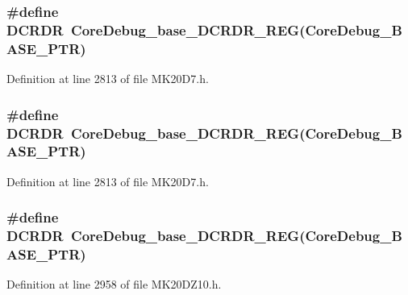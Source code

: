 \subsubsection[{\texorpdfstring{D\+C\+R\+DR}{DCRDR}}]{\setlength{\rightskip}{0pt plus 5cm}\#define D\+C\+R\+DR~{\bf Core\+Debug\+\_\+base\+\_\+\+D\+C\+R\+D\+R\+\_\+\+R\+EG}({\bf Core\+Debug\+\_\+\+B\+A\+S\+E\+\_\+\+P\+TR})}\hypertarget{group___core_debug___register___accessor___macros_gaaa7a4f8f79faea1305f3398257c656a0}{}\label{group___core_debug___register___accessor___macros_gaaa7a4f8f79faea1305f3398257c656a0}


Definition at line 2813 of file M\+K20\+D7.\+h.

\subsubsection[{\texorpdfstring{D\+C\+R\+DR}{DCRDR}}]{\setlength{\rightskip}{0pt plus 5cm}\#define D\+C\+R\+DR~{\bf Core\+Debug\+\_\+base\+\_\+\+D\+C\+R\+D\+R\+\_\+\+R\+EG}({\bf Core\+Debug\+\_\+\+B\+A\+S\+E\+\_\+\+P\+TR})}\hypertarget{group___core_debug___register___accessor___macros_gaaa7a4f8f79faea1305f3398257c656a0}{}\label{group___core_debug___register___accessor___macros_gaaa7a4f8f79faea1305f3398257c656a0}


Definition at line 2813 of file M\+K20\+D7.\+h.

\subsubsection[{\texorpdfstring{D\+C\+R\+DR}{DCRDR}}]{\setlength{\rightskip}{0pt plus 5cm}\#define D\+C\+R\+DR~{\bf Core\+Debug\+\_\+base\+\_\+\+D\+C\+R\+D\+R\+\_\+\+R\+EG}({\bf Core\+Debug\+\_\+\+B\+A\+S\+E\+\_\+\+P\+TR})}\hypertarget{group___core_debug___register___accessor___macros_gaaa7a4f8f79faea1305f3398257c656a0}{}\label{group___core_debug___register___accessor___macros_gaaa7a4f8f79faea1305f3398257c656a0}


Definition at line 2958 of file M\+K20\+D\+Z10.\+h.

